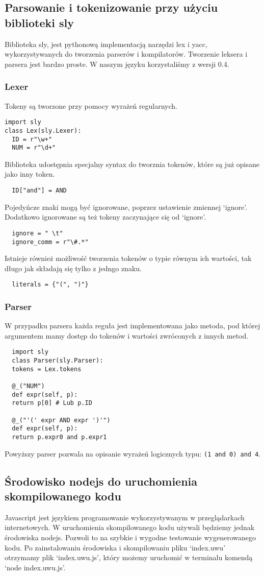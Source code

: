 \documentclass{article}
\begin{document}
\subsection{Parsowanie i tokenizowanie przy użyciu biblioteki sly}
Biblioteka sly, jest pythonową implementacją narzędzi lex i yacc, wykorzystywanych do tworzenia parserów i kompilatorów. Tworzenie leksera i parsera jest bardzo proste.
W naszym języku korzystaliśmy z wersji 0.4.

\subsubsection{Lexer}
Tokeny są tworzone przy pomocy wyrażeń regularnych.
\begin{lstlisting}
import sly
class Lex(sly.Lexer):
  ID = r"\w+"
  NUM = r"\d+"
\end{lstlisting}
Biblioteka udostępnia specjalny syntax do tworznia tokenów, które są już opisane jako inny token.
\begin{lstlisting}
  ID["and"] = AND
\end{lstlisting}
Pojedyńcze znaki mogą być ignorowane, poprzez ustawienie zmiennej `ignore'.
Dodatkowo ignorowane są też tokeny zaczynające się od `ignore'.
\begin{lstlisting}
  ignore = " \t"
  ignore_comm = r"\#.*"
\end{lstlisting}
Istnieje również możliwość tworzenia tokenów o typie równym ich wartości, tak długo jak składają się tylko z jedngo znaku.
\begin{lstlisting}
  literals = {"(", ")"}
\end{lstlisting}

\subsubsection{Parser}
W przypadku parsera każda reguła jest implementowana jako metoda, pod której argumentem mamy dostęp do tokenów i wartości zwróconych z innych metod.
\begin{lstlisting}
  import sly
  class Parser(sly.Parser):
  tokens = Lex.tokens
  
  @_("NUM")
  def expr(self, p):
  return p[0] # Lub p.ID
  
  @_("'(' expr AND expr ')'")
  def expr(self, p):
  return p.expr0 and p.expr1
\end{lstlisting}
Powyższy parser pozwala na opisanie wyrażeń logicznych typu: \lstinline{(1 and 0) and 4}.
\subsection{Środowisko nodejs do uruchomienia skompilowanego kodu}
Javascript jest językiem programowanie wykorzystywanym w przeglądarkach internetowych. W uruchomienia skompilowanego kodu używali będziemy jednak środowiska nodejs. Pozwoli to na szybkie i wygodne testowanie wygenerowanego kodu. Po zainstalowaniu środowiska i skompilowaniu pliku `index.uwu' otrzymamy plik `index.uwu.js', który możemy uruchomić w terminalu komendą `node index.uwu.js'.
\end{document}
